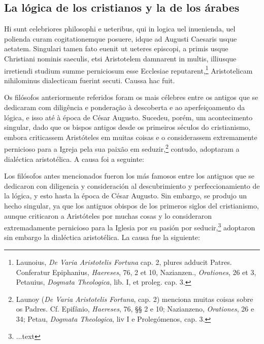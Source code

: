 \documentclass{article}
\begin{document}
\begin{paracol}{3}
\begin{nthcolumn}{2}
    \subsection*{\centering La lógica de los cristianos y la de los árabes} 
  \end{nthcolumn}
\vspace{0.5cm}
\begin{nthcolumn*}{0} %
  Hi sunt celebriores philosophi e ueteribus, qui in logica uel inuenienda, uel polienda curam cogitationemque posuere, idque ad Augusti Caesaris usque aetatem. Singulari tamen fato euenit ut ueteres episcopi, a primis usque Christiani nominis saeculis, etsi Aristotelem damnarent in multis, illiusque irretiendi studium summe perniciosum esse Ecclesiae reputarent,\footnote[43]{Launoius, \emph{De Varia Aristotelis Fortuna} cap. 2, plures adducit Patres. Conferatur Epiphanius, \emph{Haereses}, 76, 2 et 10, Nazianzen., \emph{Orationes}, 26 et 3, Petauius, \emph{Dogmata Theologica}, lib. I, et proleg. cap. 3.} Aristotelicam nihilominus dialecticam fuerint secuti. Caussa hac fuit.
\end{nthcolumn*}
\vspace{0.5cm}
\begin{nthcolumn}{1} %
  Os filósofos anteriormente referidos foram os mais célebres entre os antigos que se dedicaram com diligência e ponderação à descoberta e ao aperfeiçoamento da lógica, e isso até à época de César Augusto. Sucedeu, porém, um acontecimento singular, dado que os bispos antigos desde os primeiros séculos do cristianismo, embora criticassem Aristóteles em muitas coisas e o considerassem extremamente pernicioso para a Igreja pela sua paixão em seduzir,\footnote[43]{Launoy (\emph{De Varia Aristotelis Fortuna}, cap. 2) menciona muitas coisas sobre os Padres. Cf. Epifânio, \emph{Haereses}, 76, §§ 2 e 10; Nazianzeno, \emph{Orationes}, 26 e 34; Petau, \emph{Dogmata Theologica}, liv I e Prolegómenos, cap. 3.} contudo, adoptaram a dialéctica aristotélica. A causa foi a seguinte: 
\end{nthcolumn}
\vspace{0.5cm}
\begin{nthcolumn}{2} %
  Los filósofos antes mencionados fueron los más famosos entre los antiguos que se dedicaron con diligencia y consideración al descubrimiento y perfeccionamiento de la lógica, y esto hasta la época de César Augusto. Sin embargo, se produjo un hecho singular, ya que los antiguos obispos de los primeros siglos del cristianismo, aunque criticaron a Aristóteles por muchas cosas y lo consideraron extremadamente pernicioso para la Iglesia por su pasión por seducir,\footnote[43]{...text} adoptaron sin embargo la dialéctica aristotélica. La causa fue la siguiente:

\end{nthcolumn}
\end{paracol}
\end{document}
